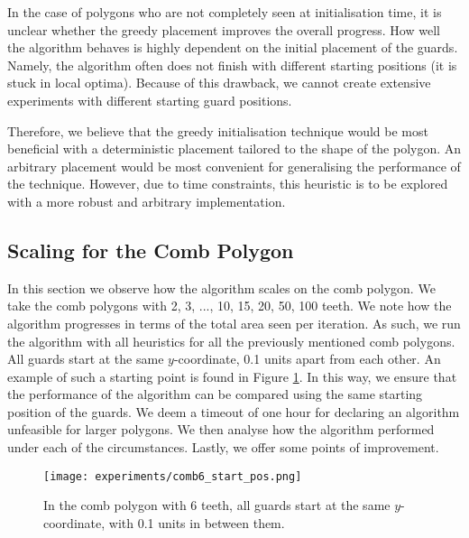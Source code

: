 In the case of polygons who are not completely seen at initialisation time, it is unclear whether the greedy placement improves the overall progress. How well the algorithm behaves is highly dependent on the initial placement of the guards. Namely, the algorithm often does not finish with different starting positions (it is stuck in local optima). Because of this drawback, we cannot create extensive experiments with different starting guard positions. 

Therefore, we believe that the greedy initialisation technique would be most beneficial with a deterministic placement tailored to the shape of the polygon. An arbitrary placement would be most convenient for generalising the performance of the technique. However, due to time constraints, this heuristic is to be explored with a more robust and arbitrary implementation.

\newpage
\subsection{Scaling for the Comb Polygon}
In this section we  observe how the algorithm scales on the comb polygon. We  take the comb polygons with 2, 3, ..., 10, 15, 20, 50, 100 teeth. We  note how the algorithm progresses in terms of the total area seen per iteration.
As such, we  run the algorithm with all heuristics for all the previously mentioned comb polygons. All guards  start at the same $y$-coordinate, 0.1 units apart from each other. An example of such a starting point is found in Figure \ref{fig:comb6_start_pos}. In this way, we  ensure that the performance of the algorithm can be compared using the same starting position of the guards. We  deem a timeout of one hour for declaring an algorithm unfeasible for larger polygons. We  then analyse how the algorithm performed under each of the circumstances. Lastly, we  offer some points of improvement.

\begin{figure}[h!]
    \centering
    \texttt{[image: experiments/comb6\_start\_pos.png]}
    \caption{In the comb polygon with 6 teeth, all guards start at the same $y$-coordinate, with 0.1 units in between them.}
    \label{fig:comb6_start_pos}
\end{figure}

